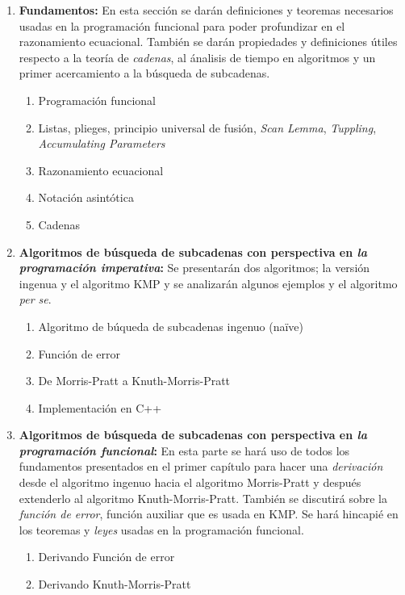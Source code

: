 \documentclass[letterpaper,11pt]{article}
\begin{document}
\begin{enumerate}

\item \textbf{Fundamentos:} En esta sección se darán definiciones y teoremas necesarios usadas en
la programación funcional para poder profundizar en el razonamiento ecuacional. También se darán
propiedades y definiciones útiles respecto a la teoría de \textit{cadenas}, 
al ánalisis de tiempo en algoritmos y un primer acercamiento a la búsqueda de subcadenas.
\begin{enumerate}
    \item Programación funcional
    \item Listas, plieges, principio universal de fusión, \textit{Scan Lemma}, \textit{Tuppling},
    \textit{Accumulating Parameters}
    \item Razonamiento ecuacional
    \item Notación asintótica
    \item Cadenas
\end{enumerate}

\item \textbf{Algoritmos de búsqueda de subcadenas con perspectiva en \textit{la programación
imperativa}:} Se presentarán dos algoritmos; la versión ingenua y el algoritmo KMP y se analizarán
algunos ejemplos y el algoritmo \textit{per se}.
\begin{enumerate}
    \item Algoritmo de búqueda de subcadenas ingenuo (naïve)
    \item Función de error
    \item De Morris-Pratt a Knuth-Morris-Pratt
    \item Implementación en C++
\end{enumerate}

\item \textbf{Algoritmos de búsqueda de subcadenas con perspectiva en \textit{la programación
funcional}:} En esta parte se hará uso de todos los fundamentos presentados en el primer capítulo
para hacer una \textit{derivación} desde el algoritmo ingenuo hacia el algoritmo Morris-Pratt y 
después extenderlo al algoritmo Knuth-Morris-Pratt. 
También se discutirá sobre la \textit{función de error}, función auxiliar que es usada en KMP. 
Se hará hincapié en los teoremas y \textit{leyes} usadas en la programación funcional.
\begin{enumerate}
    \item Derivando Función de error
    \item Derivando Knuth-Morris-Pratt
\end{enumerate}


\end{enumerate}
\end{document}
